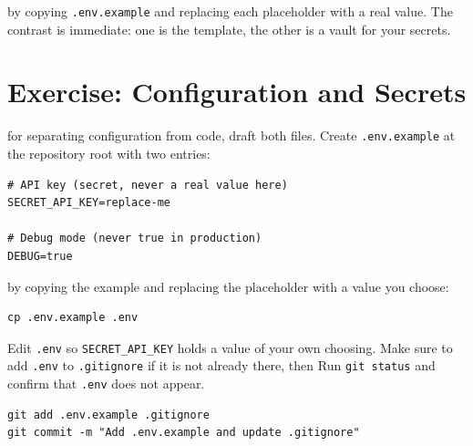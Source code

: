  by copying
\texttt{.env.example} and replacing each placeholder with a real value.
The contrast is immediate: one is the template, the other is a vault for your secrets.



\newpage
\section{Exercise: Configuration and Secrets}

for separating configuration from code, draft both files.
Create \texttt{.env.example} at the repository root with two entries:

\begin{verbatim}
# API key (secret, never a real value here)
SECRET_API_KEY=replace-me

# Debug mode (never true in production)
DEBUG=true
\end{verbatim}


 by copying the example and
replacing the placeholder with a value you choose:

\begin{verbatim}
cp .env.example .env
\end{verbatim}

Edit \texttt{.env} so \texttt{SECRET\_API\_KEY} holds a value of your own
choosing.
Make sure to add \texttt{.env} to \texttt{.gitignore} if it is not already there, then
Run \texttt{git status} and confirm that \texttt{.env} does not appear.



\begin{verbatim}
git add .env.example .gitignore
git commit -m "Add .env.example and update .gitignore"
\end{verbatim}

